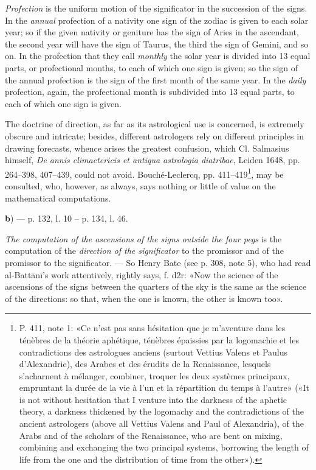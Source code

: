 \documentclass[11pt]{article}
\newcommand{\Pg}[1]{\marginpar{\footnotesize\color{gray}#1}}
\begin{document}
\par \emph{Profection} is the uniform motion of the significator in the succession of the signs. In the \emph{annual} profection of a nativity one sign of the zodiac is given to each solar year; so if the given nativity or geniture has the sign of Aries in the ascendant, the second year will have the sign of Taurus, the third the sign of Gemini, and so on. In the profection that they call \emph{monthly} the solar year is divided into 13 equal parts, or profectional months, to each of which one sign is given; so the sign of the annual profection is the sign of the first month of the same year. In the \emph{daily} profection, again, the profectional month is subdivided into 13 equal parts, to each of which one sign is given.\par
\par The doctrine of direction, as far as its astrological use is concerned, is extremely obscure and intricate; besides, different astrologers rely on different principles in drawing forecasts, whence arises the greatest confusion, which Cl. Salmasius himself, \emph{De annis climactericis et antiqua astrologia diatribae}, Leiden 1648, pp. 264–398, 407–439, could not avoid. Bouché-Leclercq, pp. 411–419\footnote{P. 411, note 1: «Ce n’est pas sans hésitation que je m’aventure dans les ténèbres de la théorie aphétique, ténèbres épaissies par la logomachie et les contradictions des astrologues anciens (surtout Vettius Valens et Paulus d’Alexandrie), des Arabes et des érudits de la Renaissance, lesquels s’acharnent à mélanger, combiner, troquer les deux systèmes principaux, empruntant la durée de la vie à l’un et la répartition du temps à l’autre» («It is not without hesitation that I venture into the darkness of the aphetic theory, a darkness thickened by the logomachy and the contradictions of the ancient astrologers (above all Vettius Valens and Paul of Alexandria), of the Arabs and of the scholars of the Renaissance, who are bent on mixing, combining and exchanging the two principal systems, borrowing the length of life from the one and the distribution of time from the other»).}, may be consulted, who, however, as always, says nothing or little of value on the mathematical computations.\par
\par\begin{center}\textbf{b}) — p. 132, l. 10 – p. 134, l. 46.\end{center}
\par \Pg{I 315}\emph{The computation of the ascensions of the signs outside the four pegs} is the computation of the \emph{direction of the significator} to the promissor and of the promissor to the significator. — So Henry Bate (see p. 308, note 5), who had read al-Battānī's work attentively, rightly says, f. d2r: «Now the science of the ascensions of the signs between the quarters of the sky is the same as the science of the directions: so that, when the one is known, the other is known too».\par
\end{document}
